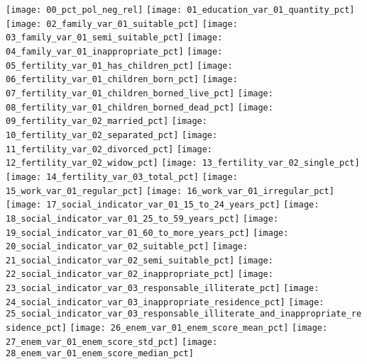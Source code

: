 
\graphicspath{ {./figuras/two_by_two_scatter_plot/} }

\texttt{[image: 00\_pct\_pol\_neg\_rel]}
\texttt{[image: 01\_education\_var\_01\_quantity\_pct]}
\texttt{[image: 02\_family\_var\_01\_suitable\_pct]}
\texttt{[image: 03\_family\_var\_01\_semi\_suitable\_pct]}
\texttt{[image: 04\_family\_var\_01\_inappropriate\_pct]}
\texttt{[image: 05\_fertility\_var\_01\_has\_children\_pct]}
\texttt{[image: 06\_fertility\_var\_01\_children\_born\_pct]}
\texttt{[image: 07\_fertility\_var\_01\_children\_borned\_live\_pct]}
\texttt{[image: 08\_fertility\_var\_01\_children\_borned\_dead\_pct]}
\texttt{[image: 09\_fertility\_var\_02\_married\_pct]}
\texttt{[image: 10\_fertility\_var\_02\_separated\_pct]}
\texttt{[image: 11\_fertility\_var\_02\_divorced\_pct]}
\texttt{[image: 12\_fertility\_var\_02\_widow\_pct]}
\texttt{[image: 13\_fertility\_var\_02\_single\_pct]}
\texttt{[image: 14\_fertility\_var\_03\_total\_pct]}
\texttt{[image: 15\_work\_var\_01\_regular\_pct]}
\texttt{[image: 16\_work\_var\_01\_irregular\_pct]}
\texttt{[image: 17\_social\_indicator\_var\_01\_15\_to\_24\_years\_pct]}
\texttt{[image: 18\_social\_indicator\_var\_01\_25\_to\_59\_years\_pct]}
\texttt{[image: 19\_social\_indicator\_var\_01\_60\_to\_more\_years\_pct]}
\texttt{[image: 20\_social\_indicator\_var\_02\_suitable\_pct]}
\texttt{[image: 21\_social\_indicator\_var\_02\_semi\_suitable\_pct]}
\texttt{[image: 22\_social\_indicator\_var\_02\_inappropriate\_pct]}
\texttt{[image: 23\_social\_indicator\_var\_03\_responsable\_illiterate\_pct]}
\texttt{[image: 24\_social\_indicator\_var\_03\_inappropriate\_residence\_pct]}
\texttt{[image: 25\_social\_indicator\_var\_03\_responsable\_illiterate\_and\_inappropriate\_residence\_pct]}
\texttt{[image: 26\_enem\_var\_01\_enem\_score\_mean\_pct]}
\texttt{[image: 27\_enem\_var\_01\_enem\_score\_std\_pct]}
\texttt{[image: 28\_enem\_var\_01\_enem\_score\_median\_pct]}

